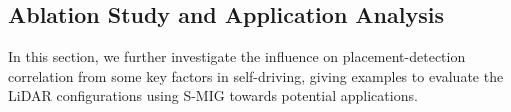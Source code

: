 \documentclass[10pt,twocolumn,letterpaper]{article}
\newcommand{\todo}[1]{\hl{[#1]}}
\begin{document}
\begin{table}[]
{%
}
\caption{Influence of scenarios with different densities of Car on \textit{Square} 3D detection.
}
\vspace*{-5mm}
\label{tab:expt5}
\end{table}

\subsection{Ablation Study and Application Analysis}
\label{sec:ablation}
In this section, we further investigate the influence on placement-detection correlation from some key factors in self-driving, giving  examples to evaluate the LiDAR configurations using S-MIG towards  potential applications.



\end{document}

